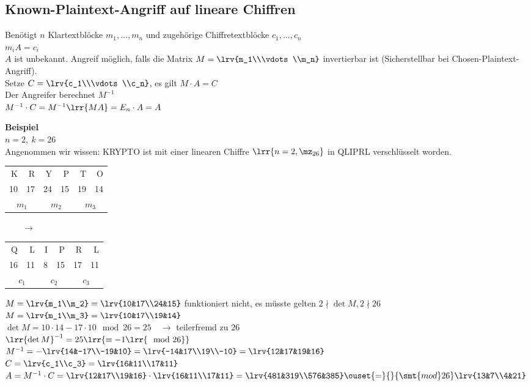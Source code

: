 	\subsection{Known-Plaintext-Angriff auf lineare Chiffren}
		Benötigt $n$ Klartextblöcke $m_1,\dots,m_n$ und zugehörige Chiffretextblöcke $c_1,\dots,c_n$\\
		$m_iA=c_i$\\
		$A$ ist unbekannt. Angreif möglich, falls die Matrix $M=\lrv{m_1\\\vdots\\m_n}$ invertierbar ist (Sicherstellbar bei Chosen-Plaintext-Angriff).\\
		Setze $C=\lrv{c_1\\\vdots\\c_n}$, es gilt $M\cdot A=C$\\
		Der Angreifer berechnet $M^{-1}$\\
		$M^{-1}\cdot C = M^{-1}\lrr{MA}=E_n\cdot A = A$
		
		\textbf{Beispiel}\\
		$n=2,\ k=26$\\
		Angenommen wir wissen: KRYPTO ist mit einer linearen Chiffre $\lrr{n=2,\mz_{26}}$ in QLIPRL verschlüsselt worden.
		
		\begin{tabular}{rr|rr|rr}
			K&R&Y&P&T&O\\
			10&17&24&15&19&14\\
			\multicolumn{2}{c|}{$m_1$}&\multicolumn{2}{c|}{$m_2$}&\multicolumn{2}{c}{$m_3$}
		\end{tabular}
		$\qquad \rightarrow\qquad$
		\begin{tabular}{rr|rr|rr}
			Q&L&I&P&R&L\\
			16&11&8&15&17&11\\
			\multicolumn{2}{c|}{$c_1$}&\multicolumn{2}{c|}{$c_2$}&\multicolumn{2}{c}{$c_3$}
		\end{tabular}
		
		$M = \lrv{m_1\\m_2}=\lrv{10&17\\24&15}$ funktioniert nicht, es müsste gelten $2\nmid\det M, 2\nmid26$\\
		$M=\lrv{m_1\\m_3}=\lrv{10&17\\19&14}$\\
		$\det M = 10\cdot 14 - 17\cdot 10 \mod 26 = 25\quad\rightarrow$ teilerfremd zu $26$\\
		$\lrr{\det M}^{-1} = 25\lrr{\equiv-1\lrr{\mod 26}}$\\
		$M^{-1} = -\lrv{14&-17\\-19&10} = \lrv{-14&17\\19\\-10}=\lrv{12&17&19&16}$\\
		$C=\lrv{c_1\\c_3}=\lrv{16&11\\17&11}$\\
		$A=M^{-1}\cdot C = \lrv{12&17\\19&16}\cdot\lrv{16&11\\17&11}=\lrv{481&319\\576&385}\ouset{=}{}{\smt{mod } 26}\lrv{13&7\\4&21}$
		
